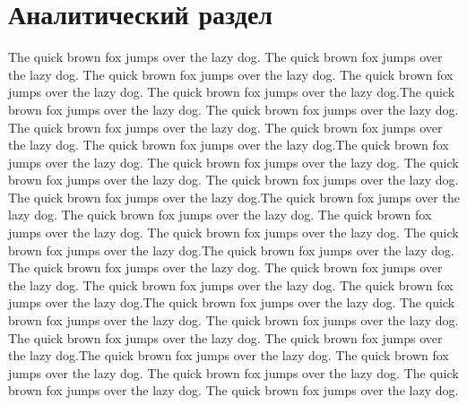 \chapter{Аналитический раздел}
\label{cha:analysis}
%
%
The quick brown fox jumps over the lazy dog.  The quick brown fox jumps over the lazy dog.  The quick brown fox jumps over the lazy dog.  The quick brown fox jumps over the lazy dog.  The quick brown fox jumps over the lazy dog.The quick brown fox jumps over the lazy dog.  The quick brown fox jumps over the lazy dog.  The quick brown fox jumps over the lazy dog.  The quick brown fox jumps over the lazy dog.  The quick brown fox jumps over the lazy dog.The quick brown fox jumps over the lazy dog.  The quick brown fox jumps over the lazy dog.  The quick brown fox jumps over the lazy dog.  The quick brown fox jumps over the lazy dog.  The quick brown fox jumps over the lazy dog.The quick brown fox jumps over the lazy dog.  The quick brown fox jumps over the lazy dog.  The quick brown fox jumps over the lazy dog.  The quick brown fox jumps over the lazy dog.  The quick brown fox jumps over the lazy dog.The quick brown fox jumps over the lazy dog.  The quick brown fox jumps over the lazy dog.  The quick brown fox jumps over the lazy dog.  The quick brown fox jumps over the lazy dog.  The quick brown fox jumps over the lazy dog.The quick brown fox jumps over the lazy dog.  The quick brown fox jumps over the lazy dog.  The quick brown fox jumps over the lazy dog.  The quick brown fox jumps over the lazy dog.  The quick brown fox jumps over the lazy dog.The quick brown fox jumps over the lazy dog.  The quick brown fox jumps over the lazy dog.  The quick brown fox jumps over the lazy dog.  The quick brown fox jumps over the lazy dog.  The quick brown fox jumps over the lazy dog.




